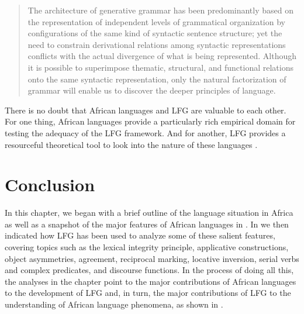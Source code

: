 \documentclass[output=paper,hidelinks]{langscibook}
\begin{document}
\begin{quote}
The architecture of generative grammar has been predominantly based on the representation of independent levels of grammatical organization by configurations of the same kind of syntactic sentence structure; yet the need to constrain derivational relations among syntactic representations conflicts with the actual divergence of what is being represented. Although it is possible to superimpose thematic, structural, and functional relations onto the same syntactic representation, only the natural factorization of grammar will enable us to discover the deeper principles of language. \citep[38]{bresnan1989locative}
\end{quote}

There is no doubt that African languages and LFG are valuable to each other. For one thing, African languages provide a particularly rich empirical domain for testing the adequacy of the LFG framework. And for another, LFG provides a resourceful theoretical tool to look into the nature of these languages \citep{Kroeger:LFG07}. 

\section{Conclusion}
\label{sec:African:4}

In this chapter, we began with a brief outline of the language situation in Africa as well as a snapshot of the major features of African languages in . In  we then indicated how LFG has been used to analyze some of these salient features, covering topics such as the lexical integrity principle, applicative constructions, object asymmetries, agreement, reciprocal marking, locative inversion, serial verbs and complex predicates, and discourse functions. In the process of doing all this, the analyses in the chapter point to the major contributions of African languages to the development of LFG and, in turn, the major contributions of LFG to the understanding of African language phenomena, as shown in . 
\end{document}
